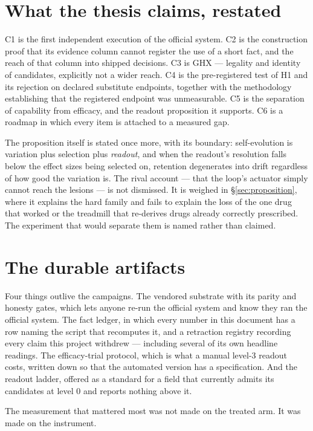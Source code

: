 \section*{What the thesis claims, restated}

C1 is the first independent execution of the official system. C2 is the
construction proof that its evidence column cannot register the use of a
short fact, and the reach of that column into shipped decisions. C3 is GHX
--- legality and identity of candidates, explicitly not a wider reach. C4
is the pre-registered test of H1 and its rejection on declared substitute
endpoints, together with the methodology establishing that the registered
endpoint was unmeasurable. C5 is the separation of capability from
efficacy, and the readout proposition it supports. C6 is a roadmap in which
every item is attached to a measured gap.

The proposition itself is stated once more, with its boundary:
self-evolution is variation plus selection plus \emph{readout}, and when
the readout's resolution falls below the effect sizes being selected on,
retention degenerates into drift regardless of how good the variation is.
The rival account --- that the loop's actuator simply cannot reach the
lesions --- is not dismissed. It is weighed in \S\ref{sec:proposition},
where it explains the hard family and fails to explain the loss of the one
drug that worked or the treadmill that re-derives drugs already correctly
prescribed. The experiment that would separate them is named rather than
claimed.

\section*{The durable artifacts}

Four things outlive the campaigns. The vendored substrate with its parity
and honesty gates, which lets anyone re-run the official system and know
they ran the official system. The fact ledger, in which every number in
this document has a row naming the script that recomputes it, and a
retraction registry recording every claim this project withdrew ---
including several of its own headline readings. The efficacy-trial
protocol, which is what a manual level-3 readout costs, written down so
that the automated version has a specification. And the readout ladder,
offered as a standard for a field that currently admits its candidates at
level 0 and reports nothing above it.

The measurement that mattered most was not made on the treated arm. It was
made on the instrument.
